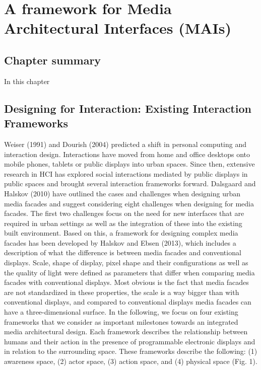 \chapter{A framework for Media Architectural Interfaces (MAIs)}
\label{chapterlabel3}

\section*{Chapter summary}

In this chapter 

\newpage


\section{Designing for Interaction: Existing Interaction Frameworks}

Weiser (1991) and Dourish (2004) predicted a shift in personal computing and
interaction design. Interactions have moved from home and office desktops onto
mobile phones, tablets or public displays into urban spaces. Since then, extensive
research in HCI has explored social interactions mediated by public displays in
public spaces and brought several interaction frameworks forward.
Dalsgaard and Halskov (2010) have outlined the cases and challenges when
designing urban media facades and suggest considering eight challenges when
designing for media facades. The first two challenges focus on the need for new
interfaces that are required in urban settings as well as the integration of these into
the existing built environment. Based on this, a framework for designing complex
media facades has been developed by Halskov and Ebsen (2013), which includes
a description of what the difference is between media facades and conventional
displays. Scale, shape of display, pixel shape and their configurations as well as the quality of light were defined as parameters that differ when comparing media
facades with conventional displays. Most obvious is the fact that media facades are
not standardized in these properties, the scale is a way bigger than with conventional
displays, and compared to conventional displays media facades can have a
three-dimensional surface. In the following, we focus on four existing frameworks that we consider as important milestones towards an integrated media architectural design. Each
framework describes the relationship between humans and their action in the presence
of programmable electronic displays and in relation to the surrounding space.
These frameworks describe the following: (1) awareness space, (2) actor space,
(3) action space, and (4) physical space (Fig. 1).

